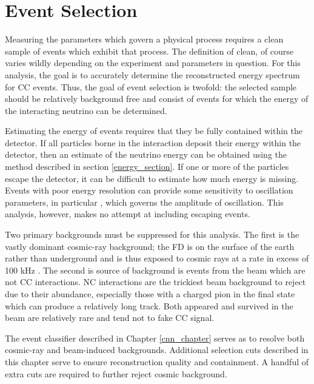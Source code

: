 \chapter{Event Selection}
\label{event_selection_chapter}

Measuring the parameters which govern a physical process requires
a clean sample of events which exhibit that process.
The definition of clean, of course varies wildly depending on the
experiment and parameters in question.
For this analysis, the goal is to accurately determine the reconstructed energy
spectrum for \numu CC events.
Thus, the goal of event selection is twofold: the selected sample should be
relatively background free and consist of events for which the energy of the
interacting neutrino can be determined.

Estimating the energy of events requires that they be fully contained
within the detector.
If all particles borne in the interaction deposit their energy within
the detector, then an estimate of the neutrino energy can be obtained using
the method described in section \ref{energy_section}.
If one or more of the particles escape the detector, it can be difficult
to estimate how much energy is missing.
Events with poor energy resolution can provide some sensitivity to oscillation
parameters, in particular \thetatth, which governs the amplitude of oscillation.
This analysis, however, makes no attempt at including escaping events.

Two primary backgrounds must be suppressed for this analysis.
The first is the vastly dominant cosmic-ray background; the FD is
on the surface of the earth rather than underground
and is thus exposed to cosmic rays at a rate in excess of 100 kHz \cite{tdr}.
The second is source of background is events from the \numi beam which are
not \numu CC interactions.
NC interactions are the trickiest beam background to reject due to their
abundance, especially those with a charged pion in the final state which
can produce a relatively long track.
Both appeared and survived \nue in the beam are relatively rare and tend
not to fake \numu CC signal.

The event classifier described in Chapter \ref{cnn_chapter} serves as to resolve
both cosmic-ray and beam-induced backgrounds.
Additional selection cuts described in this chapter serve to ensure
reconstruction quality and containment.
A handful of extra cuts are required to further reject cosmic background.


